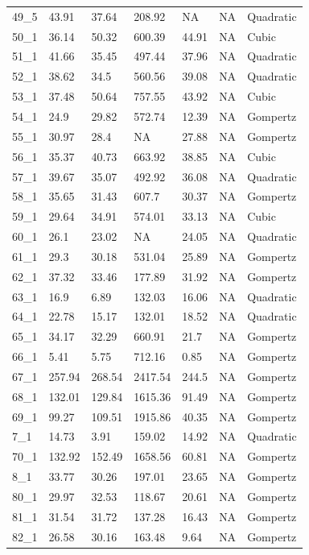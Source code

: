 \documentclass[titlepage]{article}
\begin{document}
\begin{longtable}{lllllll}
49\_5 & 43.91 & 37.64 & 208.92 & NA & NA & Quadratic \\
50\_1 & 36.14 & 50.32 & 600.39 & 44.91 & NA & Cubic \\
51\_1 & 41.66 & 35.45 & 497.44 & 37.96 & NA & Quadratic \\
52\_1 & 38.62 & 34.5 & 560.56 & 39.08 & NA & Quadratic \\
53\_1 & 37.48 & 50.64 & 757.55 & 43.92 & NA & Cubic \\
54\_1 & 24.9 & 29.82 & 572.74 & 12.39 & NA & Gompertz \\
55\_1 & 30.97 & 28.4 & NA & 27.88 & NA & Gompertz \\
56\_1 & 35.37 & 40.73 & 663.92 & 38.85 & NA & Cubic \\
57\_1 & 39.67 & 35.07 & 492.92 & 36.08 & NA & Quadratic \\
58\_1 & 35.65 & 31.43 & 607.7 & 30.37 & NA & Gompertz \\
59\_1 & 29.64 & 34.91 & 574.01 & 33.13 & NA & Cubic \\
60\_1 & 26.1 & 23.02 & NA & 24.05 & NA & Quadratic \\
61\_1 & 29.3 & 30.18 & 531.04 & 25.89 & NA & Gompertz \\
62\_1 & 37.32 & 33.46 & 177.89 & 31.92 & NA & Gompertz \\
63\_1 & 16.9 & 6.89 & 132.03 & 16.06 & NA & Quadratic \\
64\_1 & 22.78 & 15.17 & 132.01 & 18.52 & NA & Quadratic \\
65\_1 & 34.17 & 32.29 & 660.91 & 21.7 & NA & Gompertz \\
66\_1 & 5.41 & 5.75 & 712.16 & 0.85 & NA & Gompertz \\
67\_1 & 257.94 & 268.54 & 2417.54 & 244.5 & NA & Gompertz \\
68\_1 & 132.01 & 129.84 & 1615.36 & 91.49 & NA & Gompertz \\
69\_1 & 99.27 & 109.51 & 1915.86 & 40.35 & NA & Gompertz \\
7\_1 & 14.73 & 3.91 & 159.02 & 14.92 & NA & Quadratic \\
70\_1 & 132.92 & 152.49 & 1658.56 & 60.81 & NA & Gompertz \\
8\_1 & 33.77 & 30.26 & 197.01 & 23.65 & NA & Gompertz \\
80\_1 & 29.97 & 32.53 & 118.67 & 20.61 & NA & Gompertz \\
81\_1 & 31.54 & 31.72 & 137.28 & 16.43 & NA & Gompertz \\
82\_1 & 26.58 & 30.16 & 163.48 & 9.64 & NA & Gompertz \\

\end{longtable}
\end{document}
